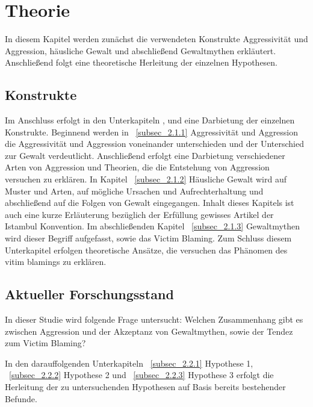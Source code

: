 

\chapter{Theorie}   \label{ch_2}
In diesem Kapitel werden zunächst die verwendeten Konstrukte Aggressivität und Aggression, häusliche Gewalt und abschließend Gewaltmythen erkläutert. Anschließend folgt eine theoretische Herleitung der einzelnen Hypothesen.

\section{Konstrukte}    \label{sec_2.1}
Im Anschluss erfolgt in den Unterkapiteln ,  und  eine Darbietung der einzelnen Konstrukte. Beginnend werden in ~\ref{subsec_2.1.1} Aggressivität und Aggression die Aggressivität und Aggression voneinander unterschieden und der Unterschied zur Gewalt verdeutlicht. Anschließend erfolgt eine Darbietung verschiedener Arten von Aggression und Theorien, die die Entstehung von Aggression versuchen zu erklären. In Kapitel ~\ref{subsec_2.1.2} Häusliche Gewalt wird auf Muster und Arten, auf mögliche Ursachen und Aufrechterhaltung und abschließend auf die Folgen von Gewalt eingegangen. Inhalt dieses Kapitels ist auch eine kurze Erläuterung bezüglich der Erfüllung gewisses Artikel der Istambul Konvention. Im abschließenden Kapitel ~\ref{subsec_2.1.3} Gewaltmythen wird dieser Begriff aufgefasst, sowie das Victim Blaming. Zum Schluss diesem Unterkapitel erfolgen theoretische Ansätze, die versuchen das Phänomen des vitim blamings zu erklären.





\section{Aktueller Forschungsstand}   \label{sec_2.2}
In dieser Studie wird folgende Frage untersucht: Welchen Zusammenhang gibt es zwischen Aggression und der Akzeptanz von Gewaltmythen, sowie der Tendez zum Victim Blaming? 

In den darauffolgenden Unterkapiteln ~\ref{subsec_2.2.1} Hypothese 1, ~\ref{subsec_2.2.2} Hypothese 2 und ~\ref{subsec_2.2.3} Hypothese 3 erfolgt die Herleitung der zu untersuchenden Hypothesen auf Basis bereits bestehender Befunde.



